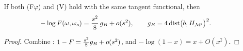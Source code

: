 \begin{theorem}\label{thm:secvar}
If both \textup{(F$\varphi$)} and \textup{(V)} hold with the same tangent functional, then
\begin{equation}\label{eq:secvar}
 -\log F(\omega,\omega_{s})=\frac{s^{2}}{8}\,g_{B}+o(s^{2}),\qquad
 g_{B}=4\operatorname{dist}\bigl(b,H_{\mathcal M'}\bigr)^{2}.
\end{equation}
\end{theorem}

\begin{proof}
Combine : $1-F=\frac{s^{2}}{8}g_{B}+o(s^{2})$, and
$-\log(1-x)=x+O(x^{2})$.
\end{proof}
